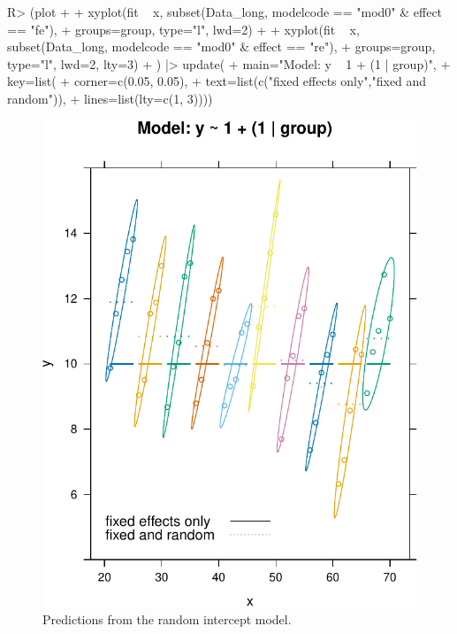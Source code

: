 \documentclass[
]{jss}
\begin{document}
\begin{CodeChunk}
\begin{CodeInput}
R> (plot +
+   xyplot(fit ~ x, subset(Data_long, modelcode == "mod0" & effect == "fe"),
+          groups=group, type="l", lwd=2) +
+   xyplot(fit ~ x, subset(Data_long, modelcode == "mod0" &  effect == "re"),
+          groups=group, type="l", lwd=2, lty=3)
+ ) |> update(
+   main="Model: y ~ 1 + (1 | group)",
+   key=list(
+     corner=c(0.05, 0.05),
+     text=list(c("fixed effects only","fixed and random")),
+     lines=list(lty=c(1, 3))))
\end{CodeInput}
\begin{figure}

{\centering \includegraphics[width=1\linewidth]{JSS-article_files/figure-latex/plot-fits-mod0-1} 

}

\caption[Predictions from the random intercept model]{Predictions from the random intercept model.}\label{fig:plot-fits-mod0}
\end{figure}
\end{CodeChunk}
\end{document}
